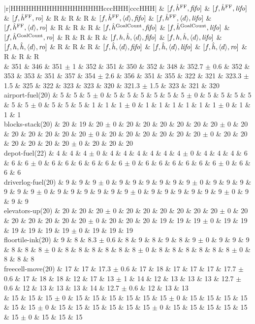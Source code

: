 \begin{center}
\begin{tabular}{|r|HHHHHHHHHHHHHHHHHHcccHHH|cccHHH|}
 & $[f,\hat{h}^{\text{FF}},{\text{\textit{fifo}}}]$ & $[f,\hat{h}^{\text{FF}},{\text{\textit{lifo}}}]$ & $[f,\hat{h}^{\text{FF}},{\text{\textit{ro}}}]$ & R & R & R & $[f,\hat{h}^{\text{FF}},{\left<d\right>},{\text{\textit{fifo}}}]$ & $[f,\hat{h}^{\text{FF}},{\left<d\right>},{\text{\textit{lifo}}}]$ & $[f,\hat{h}^{\text{FF}},{\left<d\right>},{\text{\textit{ro}}}]$ & R & R & R & $[f,\hat{h}^{\text{GoalCount}},{\text{\textit{fifo}}}]$ & $[f,\hat{h}^{\text{GoalCount}},{\text{\textit{lifo}}}]$ & $[f,\hat{h}^{\text{GoalCount}},{\text{\textit{ro}}}]$ & R & R & R & $[f,h,\hat{h},{\left<d\right>},{\text{\textit{fifo}}}]$ & $[f,h,\hat{h},{\left<d\right>},{\text{\textit{lifo}}}]$ & $[f,h,\hat{h},{\left<d\right>},{\text{\textit{ro}}}]$ & R & R & R & $[f,\hat{h},{\left<d\right>},{\text{\textit{fifo}}}]$ & $[f,\hat{h},{\left<d\right>},{\text{\textit{lifo}}}]$ & $[f,\hat{h},{\left<d\right>},{\text{\textit{ro}}}]$ & R & R & R\\
\hline
 & 351 & 346 & 351 $\pm$ 1 & 352 & 351 & 350 & 352 & 348 & 352.7 $\pm$ 0.6 & 352 & 353 & 353 & 351 & 357 & 354 $\pm$ 2.6 & 356 & 351 & 355 & 322 & 321 & 323.3 $\pm$ 1.5 & 325 & 322 & 323 & 323 & 320 & 321.3 $\pm$ 1.5 & 323 & 321 & 320\\
\hline
airport-fuel(20) & 5 & 5 & 5 $\pm$ 0 & 5 & 5 & 5 & 5 & 5 & 5 $\pm$ 0 & 5 & 5 & 5 & 5 & 5 & 5 $\pm$ 0 & 5 & 5 & 5 & 1 & 1 & 1 $\pm$ 0 & 1 & 1 & 1 & 1 & 1 & 1 $\pm$ 0 & 1 & 1 & 1\\
blocks-stack(20) & 20 & 19 & 20 $\pm$ 0 & 20 & 20 & 20 & 20 & 20 & 20 $\pm$ 0 & 20 & 20 & 20 & 20 & 20 & 20 $\pm$ 0 & 20 & 20 & 20 & 20 & 20 & 20 $\pm$ 0 & 20 & 20 & 20 & 20 & 20 & 20 $\pm$ 0 & 20 & 20 & 20\\
depot-fuel(22) & 4 & 4 & 4 $\pm$ 0 & 4 & 4 & 4 & 4 & 4 & 4 $\pm$ 0 & 4 & 4 & 4 & 6 & 6 & 6 $\pm$ 0 & 6 & 6 & 6 & 6 & 6 & 6 $\pm$ 0 & 6 & 6 & 6 & 6 & 6 & 6 $\pm$ 0 & 6 & 6 & 6\\
driverlog-fuel(20) & 9 & 9 & 9 $\pm$ 0 & 9 & 9 & 9 & 9 & 9 & 9 $\pm$ 0 & 9 & 9 & 9 & 9 & 9 & 9 $\pm$ 0 & 9 & 9 & 9 & 9 & 9 & 9 $\pm$ 0 & 9 & 9 & 9 & 9 & 9 & 9 $\pm$ 0 & 9 & 9 & 9\\
elevators-up(20) & 20 & 20 & 20 $\pm$ 0 & 20 & 20 & 20 & 20 & 20 & 20 $\pm$ 0 & 20 & 20 & 20 & 20 & 20 & 20 $\pm$ 0 & 20 & 20 & 20 & 19 & 19 & 19 $\pm$ 0 & 19 & 19 & 19 & 19 & 19 & 19 $\pm$ 0 & 19 & 19 & 19\\
floortile-ink(20) & 9 & 8 & 8.3 $\pm$ 0.6 & 8 & 9 & 8 & 9 & 8 & 9 $\pm$ 0 & 9 & 9 & 9 & 8 & 8 & 8 $\pm$ 0 & 8 & 8 & 8 & 8 & 8 & 8 $\pm$ 0 & 8 & 8 & 8 & 8 & 8 & 8 $\pm$ 0 & 8 & 8 & 8\\
freecell-move(20) & 17 & 17 & 17.3 $\pm$ 0.6 & 17 & 18 & 17 & 17 & 17 & 17.7 $\pm$ 0.6 & 17 & 18 & 18 & 12 & 17 & 13 $\pm$ 1 & 14 & 12 & 13 & 13 & 13 & 12.7 $\pm$ 0.6 & 12 & 13 & 13 & 13 & 14 & 12.7 $\pm$ 0.6 & 12 & 13 & 13\\
 & 15 & 15 & 15 $\pm$ 0 & 15 & 15 & 15 & 15 & 15 & 15 $\pm$ 0 & 15 & 15 & 15 & 15 & 15 & 15 $\pm$ 0 & 15 & 15 & 15 & 15 & 15 & 15 $\pm$ 0 & 15 & 15 & 15 & 15 & 15 & 15 $\pm$ 0 & 15 & 15 & 15\\

\end{tabular}
\end{center}
